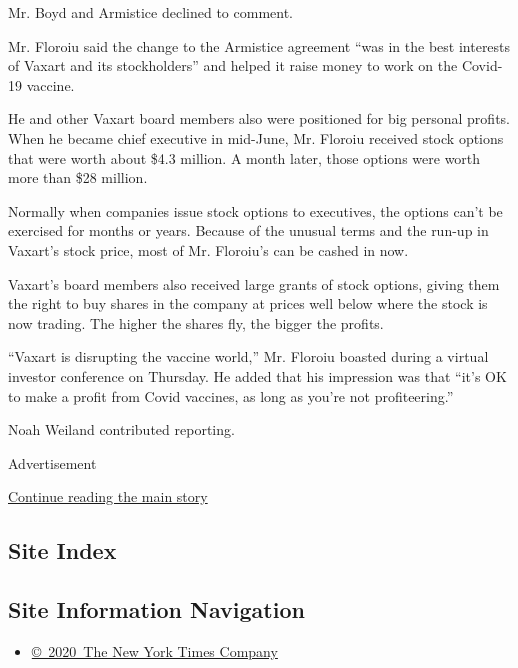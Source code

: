 Mr. Boyd and Armistice declined to comment.

Mr. Floroiu said the change to the Armistice agreement ``was in the best
interests of Vaxart and its stockholders'' and helped it raise money to
work on the Covid-19 vaccine.

He and other Vaxart board members also were positioned for big personal
profits. When he became chief executive in mid-June, Mr. Floroiu
received stock options that were worth about \$4.3 million. A month
later, those options were worth more than \$28 million.

Normally when companies issue stock options to executives, the options
can't be exercised for months or years. Because of the unusual terms and
the run-up in Vaxart's stock price, most of Mr. Floroiu's can be cashed
in now.

Vaxart's board members also received large grants of stock options,
giving them the right to buy shares in the company at prices well below
where the stock is now trading. The higher the shares fly, the bigger
the profits.

``Vaxart is disrupting the vaccine world,'' Mr. Floroiu boasted during a
virtual investor conference on Thursday. He added that his impression
was that ``it's OK to make a profit from Covid vaccines, as long as
you're not profiteering.''

Noah Weiland contributed reporting.

Advertisement

\protect\hyperlink{after-bottom}{Continue reading the main story}

\hypertarget{site-index}{%
\subsection{Site Index}\label{site-index}}

\hypertarget{site-information-navigation}{%
\subsection{Site Information
Navigation}\label{site-information-navigation}}

\begin{itemize}
\tightlist
\item
  \href{https://help.nytimes.com/hc/en-us/articles/115014792127-Copyright-notice}{©~2020~The
  New York Times Company}
\end{itemize}

